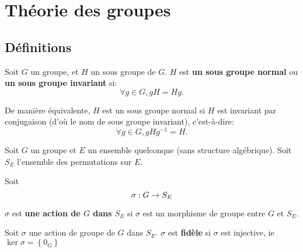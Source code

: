 \chapter{Théorie des groupes}
\label{chapter_group_theory}

\section{Définitions}

\begin{definition}
	Soit $G$ un groupe, et $H$ un sous groupe de $G$.
	$H$ est \textbf{un sous groupe normal} ou \textbf{un sous groupe invariant}
	si:
	\begin{equation}
		\forall g \in G, gH = Hg.
		\label{definition_normal_subgroup}
	\end{equation}

	De manière équivalente, $H$ est un sous groupe normal si $H$ est invariant
	par conjugaison (d'où le nom de sous groupe invariant), c'est-à-dire:
	\begin{equation}
		\forall g \in G, gHg^{-1} = H.
		\label{definition_normal_subgroup2}
	\end{equation}
\end{definition}

\begin{definition} 
	Soit $G$ un groupe et $E$ un ensemble quelconque (sans structure
	algébrique). Soit $S_{E}$ l'ensemble des permutations sur $E$.

	Soit
	\begin{equation}
		\sigma : G \rightarrow S_{E}
		\label{definition_group_action}
	\end{equation}

	$\sigma$ est \textbf{une action de $G$ dans $S_{E}$} si $\sigma$ est un
	morphisme de groupe entre $G$ et $S_{E}$.
\end{definition}

\begin{definition} 
	Soit $\sigma$ une action de groupe de $G$ dans $S_{E}$.
	$\sigma$ est \textbf{fidèle} si $\sigma$ est injective, ie $\ker{\sigma} =
	\left\{ 0_{G} \right\}$
\end{definition}

